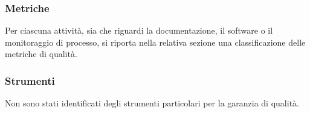 	\subsubsection{Metriche}

		Per ciascuna attività, sia che riguardi la documentazione, il software o il monitoraggio di processo, si riporta nella relativa sezione una classificazione delle metriche di qualità.	

	\subsubsection{Strumenti}

	Non sono stati identificati degli strumenti particolari per la garanzia di qualità.







		
